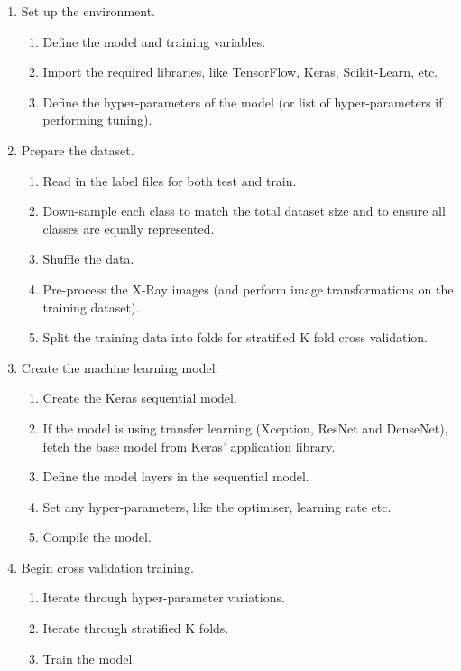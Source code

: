 \begin{enumerate}
    \item Set up the environment.
    \begin{enumerate}
        \item Define the model and training variables.
        \item Import the required libraries, like TensorFlow, Keras, Scikit-Learn, etc.
        \item Define the hyper-parameters of the model (or list of hyper-parameters if performing tuning).
    \end{enumerate}
    \item Prepare the dataset.
    \begin{enumerate}
        \item Read in the label files for both test and train.
        \item Down-sample each class to match the total dataset size and to ensure all classes are equally represented.
        \item Shuffle the data.
        \item Pre-process the X-Ray images (and perform image transformations on the training dataset).
        \item Split the training data into folds for stratified K fold cross validation.
    \end{enumerate}
    \item Create the machine learning model.
    \begin{enumerate}
        \item Create the Keras sequential model.
        \item If the model is using transfer learning (Xception, ResNet and DenseNet), fetch the base model from Keras' application library.
        \item Define the model layers in the sequential model.
        \item Set any hyper-parameters, like the optimiser, learning rate etc.
        \item Compile the model.
    \end{enumerate}
    \item Begin cross validation training.
    \begin{enumerate}
        \item Iterate through hyper-parameter variations.
        \item Iterate through stratified K folds.
        \item Train the model.

\end{enumerate}
\end{enumerate}
